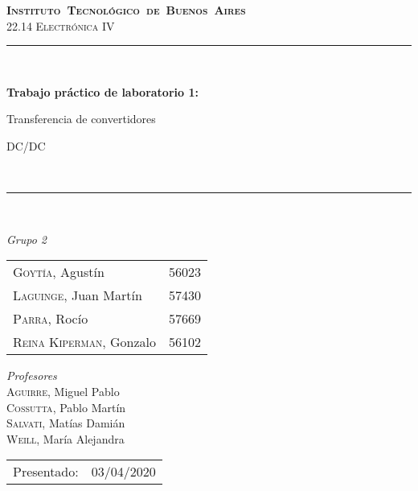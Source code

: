 \begin{titlepage}
\newcommand{\HRule}{\rule{\linewidth}{0.5mm}}
\center
\mbox{\textsc{\LARGE \bfseries {Instituto Tecnol\'ogico de Buenos Aires}}}\\[1.5cm]
\textsc{\Large 22.14 Electr\'onica IV}\\[0.5cm]


\HRule \\[0.6cm]
{ \Huge \bfseries Trabajo pr\'actico de laboratorio  1: 

 Transferencia de convertidores 

\vspace{0.4cm} 
 DC/DC}\\[0.4cm] %
\HRule \\[1.5cm]


{\large

\emph{Grupo 2}\\
\vspace{3px}

\begin{tabular}{lr} 	
\textsc{Goyt\'ia}, Agust\'in  & 56023 \\
\textsc{Laguinge}, Juan Mart\'in  & 57430 \\
\textsc{Parra}, Roc\'io  & 57669 \\
\textsc{Reina Kiperman}, Gonzalo  & 56102 \\
\end{tabular}

\vspace{20px}

\emph{Profesores}\\
\vspace{3px}
\textsc{Aguirre}, Miguel Pablo\\ 
\textsc{Cossutta}, Pablo Mart\'in\\ 
\textsc{Salvati}, Mat\'ias Dami\'an\\	
\textsc{Weill}, Mar\'ia Alejandra\\ 	

\vspace{100px}

\begin{tabular}{ll}

Presentado: & 03/04/2020\\

\end{tabular}

}

\vfill

\end{titlepage}